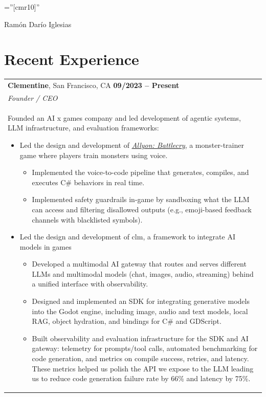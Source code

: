 \documentclass[a4paper,10pt]{article}
\begin{document}
\pagestyle{empty}

\font\fb=''[cmr10]''

{\centering
		{\Large Ram\'{o}n Dar\'{i}o   Iglesias
	}\par}


\section{Recent Experience}
\begin{tabularx}{\textwidth}{Xr}

{\bf{Clementine}}, San Francisco, CA \hfill \bf{09/2023 -- Present}\\
\emph{Founder / CEO} \\
\multicolumn{2}{p{0.98\textwidth}}{
Founded an AI x games company and led development of agentic systems, LLM infrastructure, and evaluation frameworks:
\begin{itemize}
  \item Led the design and development of \href{https://store.steampowered.com/app/3987700/Allyon_Battlecry/}{\emph{Allyon: Battlecry}}, a monster-trainer game where players train monsters using voice.
    \begin{itemize}
        \item Implemented the voice-to-code pipeline that generates, compiles, and executes C\# behaviors in real time.
        \item Implemented safety guardrails in-game by sandboxing what the LLM can access and filtering disallowed outputs (e.g., emoji-based feedback channels with blacklisted symbols).
    \end{itemize}
  \item Led the design and development of clm, a framework to integrate AI models in games
    \begin{itemize}
        \item Developed a multimodal AI gateway that routes and serves different LLMs and multimodal models (chat, images, audio, streaming) behind a unified interface with observability.
        \item Designed and implemented an SDK for integrating generative models into the Godot engine, including image, audio and text models, local RAG, object hydration, and bindings for C\# and GDScript.
        \item Built observability and evaluation infrastructure for the SDK and AI gateway: telemetry for prompts/tool calls, automated benchmarking for code generation, and metrics on compile success, retries, and latency. These metrics helped us polish the API we expose to the LLM leading us to reduce code generation failure rate by 66\% and latency by 75\%.

\end{itemize}
\end{itemize}}
\end{tabularx}
\end{document}
